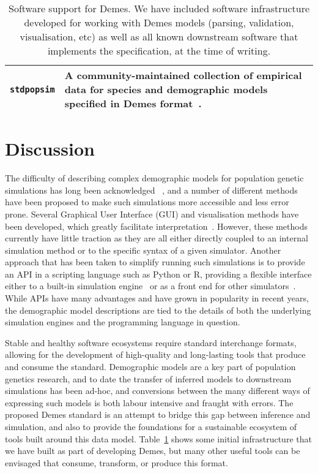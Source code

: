 \documentclass[11pt]{article}
\newcommand{\stdpopsim}[0]{\texttt{stdpopsim}}
\begin{document}
\begin{table}
\begin{center}
\begin{tabular}{lp{12cm}}
\stdpopsim &
    A community-maintained collection of empirical data for species
    and demographic models specified in Demes
    format~\citep{adrion2020community}.\\

\bottomrule
\end{tabular}
\end{center}
\caption{\label{tab-software}
Software support for Demes. We have included software infrastructure developed
for working with Demes models (parsing, validation, visualisation, etc)
as well as all known downstream software that implements the specification,
at the time of writing.}
\end{table}

\section*{Discussion}

The difficulty of describing complex demographic models
for population genetic simulations has long been acknowledged
~\citep[][e.g.]{antao2007modeler4simcoal2}, %
and a number of different methods have been proposed to
make such simulations more accessible and less error prone.
Several Graphical User Interface (GUI) and visualisation
methods have been developed, which greatly facilitate
interpretation~\citep{mailund2005coasim,antao2007modeler4simcoal2,
ewing2010msms,zhou2018popdemog}. However, these methods
currently have little traction as they are all either directly coupled
to an internal simulation method or to the specific syntax
of a given simulator. Another approach that has been taken to
simplify running such simulations is to provide an API in a
scripting language such as Python or R, providing a flexible
interface either to a built-in simulation
engine~\citep{thornton2014cpp,thornton2019-nu,baumdicker2021-iu,kelleher2016efficient,haller2017flexible}
or as a front end for other simulators~\citep{staab2016coala}.
While APIs have many advantages and have grown in popularity in
recent years, the demographic model descriptions are tied
to the details of both the underlying simulation engines
and the programming language in question.

Stable and healthy software ecosystems require standard interchange
formats, allowing for the development of high-quality and long-lasting
tools that produce and consume the standard.
Demographic models are a key part of population genetics research,
and to date the transfer of inferred models to downstream simulations
has been ad-hoc, and conversions between the many different ways
of expressing such models is both labour intensive and fraught with errors.
The proposed Demes standard is an attempt to bridge this gap
between inference and simulation, and also to provide the foundations
for a sustainable ecosystem of tools built around this data model.
Table~\ref{tab-software} shows some initial infrastructure that we have
built as part of developing Demes, but many other useful tools
can be envisaged that consume, transform, or produce this format.
\end{document}
